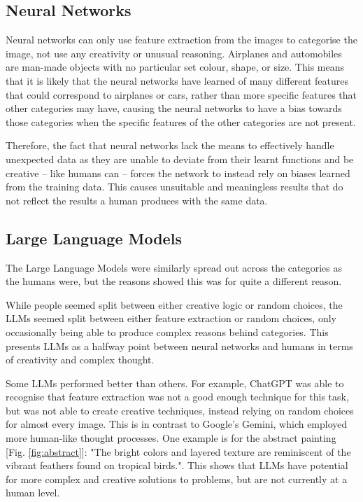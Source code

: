 \documentclass{article}
\begin{document}
\subsection{Neural Networks}
Neural networks can only use feature extraction from the images to categorise the image, not use any creativity or unusual reasoning. Airplanes and automobiles are man-made objects with no particular set colour, shape, or size. This means that it is likely that the neural networks have learned of many different features that could correspond to airplanes or cars, rather than more specific features that other categories may have, causing the neural networks to have a bias towards those categories when the specific features of the other categories are not present.

\vspace{3mm}
Therefore, the fact that neural networks lack the means to effectively handle unexpected data as they are unable to deviate from their learnt functions and be creative -- like humans can -- forces the network to instead rely on biases learned from the training data. This causes unsuitable and meaningless results that do not reflect the results a human produces with the same data.



\subsection{Large Language Models}
The Large Language Models were similarly spread out across the categories as the humans were, but the reasons showed this was for quite a different reason.

While people seemed split between either creative logic or random choices, the LLMs seemed split between either feature extraction or random choices, only occasionally being able to produce complex reasons behind categories. This presents LLMs as a halfway point between neural networks and humans in terms of creativity and complex thought.

Some LLMs performed better than others. For example, ChatGPT was able to recognise that feature extraction was not a good enough technique for this task, but was not able to create creative techniques, instead relying on random choices for almost every image. This is in contrast to Google's Gemini, which employed more human-like thought processes. One example is for the abstract painting [Fig. \ref{fig:abstract}]: "The bright colors and layered texture are reminiscent of the vibrant feathers found on tropical birds.". This shows that LLMs have potential for more complex and creative solutions to problems, but are not currently at a human level.
\end{document}
